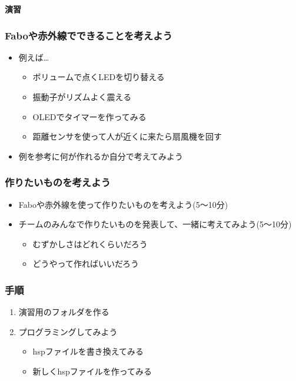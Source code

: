 \documentclass[slide05.tex]{subfiles}
\begin{document}
\begin{frame}[plain]
    \begin{center}
        \vspace{48pt}
        {\huge\bf 演習}
    \end{center}
\end{frame}

\begin{frame}[fragile]
    \frametitle{Faboや赤外線でできることを考えよう}
    \begin{center}
        \begin{itemize}
            \item 例えば\dots
            \begin{itemize}
                \item ボリュームで点くLEDを切り替える
                \item 振動子がリズムよく震える
                \item OLEDでタイマーを作ってみる
                \item 距離センサを使って人が近くに来たら扇風機を回す
            \end{itemize}
            \item 例を参考に何が作れるか自分で考えてみよう
        \end{itemize}
    \end{center}
\end{frame}

\begin{frame}[fragile]
    \frametitle{作りたいものを考えよう}
    \begin{center}
        \begin{itemize}
            \item Faboや赤外線を使って作りたいものを考えよう(5〜10分)
            \item チームのみんなで作りたいものを発表して、一緒に考えてみよう(5〜10分)
            \begin{itemize}
                \item むずかしさはどれくらいだろう
                \item どうやって作ればいいだろう
            \end{itemize}
        \end{itemize}
    \end{center}
\end{frame}

\begin{frame}[fragile]
    \frametitle{手順}
    \begin{center}
        \begin{enumerate}
            \item 演習用のフォルダを作る
            \item プログラミングしてみよう
            \begin{itemize}
                \item hspファイルを書き換えてみる
                \item 新しくhspファイルを作ってみる
            \end{itemize}
        \end{enumerate}
    \end{center}
\end{frame}
\end{document}
